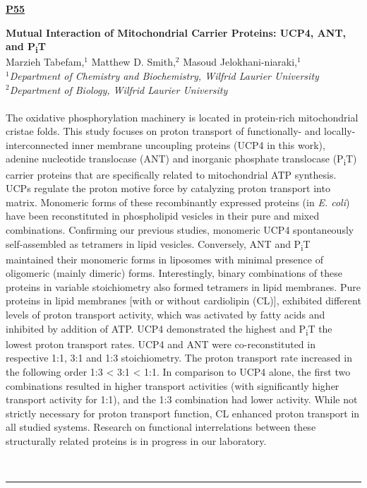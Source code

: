 \documentclass[titlepage,oneside,openany,10pt]{book}
\newenvironment{posterabs}[4] %
        {
	\begin{flushright}
                \underline{\textbf{#4}}
        \end{flushright}
        \textbf{#1}\\%
        #2\\%
        \textit{#3}\\\\%
        }
        {
        \\
        \noindent\rule{15cm}{0.5pt}%
        }
\begin{document}
\begin{posterabs}
    {Mutual Interaction of Mitochondrial Carrier Proteins: UCP4, ANT, and P\textsubscript{i}T}
    {Marzieh Tabefam,$^{1}$ Matthew D. Smith,$^{2}$ Masoud Jelokhani-niaraki,$^{1}$}
    {
    $^1$Department of Chemistry and Biochemistry, Wilfrid Laurier University\\
    $^2$Department of Biology, Wilfrid Laurier University
    }
    {P55}
    The oxidative phosphorylation machinery is located in protein-rich mitochondrial cristae folds. This study focuses on proton transport of functionally- and locally-interconnected inner membrane uncoupling proteins (UCP4 in this work), adenine nucleotide translocase (ANT) and inorganic phosphate translocase (P\textsubscript{i}T) carrier proteins that are specifically related to mitochondrial ATP synthesis. UCPs regulate the proton motive force by catalyzing proton transport into matrix. Monomeric forms of these recombinantly expressed proteins (in \emph{E. coli}) have been reconstituted in phospholipid vesicles in their pure and mixed combinations. Confirming our previous studies, monomeric UCP4 spontaneously self-assembled as tetramers in lipid vesicles. Conversely, ANT and P\textsubscript{i}T maintained their monomeric forms in liposomes with minimal presence of oligomeric (mainly dimeric) forms. Interestingly, binary combinations of these proteins in variable stoichiometry also formed tetramers in lipid membranes. Pure proteins in lipid membranes {[}with or without cardiolipin (CL){]}, exhibited different levels of proton transport activity, which was activated by fatty acids and inhibited by addition of ATP. UCP4 demonstrated the highest and P\textsubscript{i}T the lowest proton transport rates. UCP4 and ANT were co-reconstituted in respective 1:1, 3:1 and 1:3 stoichiometry. The proton transport rate increased in the following order 1:3 \textless{} 3:1 \textless{} 1:1. In comparison to UCP4 alone, the first two combinations resulted in higher transport activities (with significantly higher transport activity for 1:1), and the 1:3 combination had lower activity. While not strictly necessary for proton transport function, CL enhanced proton transport in all studied systems. Research on functional interrelations between these structurally related proteins is in progress in our laboratory.
    \label{TabefamM}
\end{posterabs}
\end{document}
